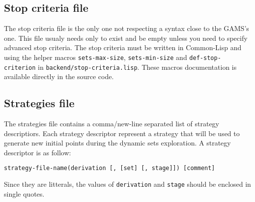 \documentclass{article}
\begin{document}
\subsection*{Stop criteria file}

The stop criteria file is the only one not respecting a syntax close to the
GAMS's one. This file usualy needs only to exist and be empty unless you need to
specify advanced stop criteria. The stop criteria must be written in Common-Lisp
and using the helper macros \texttt{sets-max-size}, \texttt{sets-min-size} and
\texttt{def-stop-criterion} in \texttt{backend/stop-criteria.lisp}. These macros
documentation is available directly in the source code.

\subsection*{Strategies file}

The strategies file contains a comma/new-line separated list of strategy
descriptiors. Each strategy descriptor represent a strategy that will be used
to generate new initial points during the dynamic sets exploration.
A strategy descriptor is as follow:
\begin{center}
  \texttt{strategy-file-name(derivation [, [set] [, stage]]) [comment]}
\end{center}
Since they are litterals, the values of \texttt{derivation} and \texttt{stage}
should be enclosed in single quotes.
\end{document}
